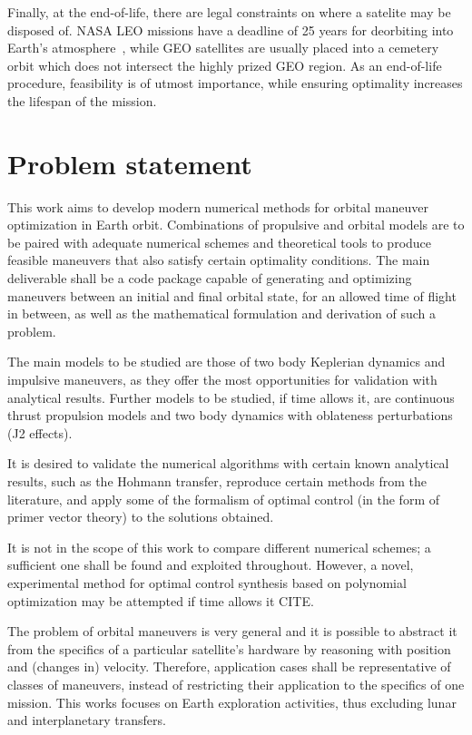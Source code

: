 Finally, at the end-of-life, there are legal constraints on where a satelite may be disposed of. NASA LEO missions have a deadline of 25 years for deorbiting into Earth's atmosphere~\cite{nasa_deorbit}, while GEO satellites are usually placed into a cemetery orbit which does not intersect the highly prized GEO region. As an end-of-life procedure, feasibility is of utmost importance, while ensuring optimality increases the lifespan of the mission.

\section{Problem statement}

This work aims to develop modern numerical methods for orbital maneuver optimization in Earth orbit. Combinations of propulsive and orbital models are to be paired with adequate numerical schemes and theoretical tools to produce feasible maneuvers that also satisfy certain optimality conditions. The main deliverable shall be a code package capable of generating and optimizing maneuvers between an initial and final orbital state, for an allowed time of flight in between, as well as the mathematical formulation and derivation of such a problem.

The main models to be studied are those of two body Keplerian dynamics and impulsive maneuvers, as they offer the most opportunities for validation with analytical results. Further models to be studied, if time allows it, are continuous thrust propulsion models and two body dynamics with oblateness perturbations (J2 effects).

It is desired to validate the numerical algorithms with certain known analytical results, such as the Hohmann transfer, reproduce certain methods from the literature, and apply some of the formalism of optimal control (in the form of primer vector theory) to the solutions obtained. 

It is not in the scope of this work to compare different numerical schemes; a sufficient one shall be found and exploited throughout. However, a novel, experimental method for optimal control synthesis based on polynomial optimization may be attempted if time allows it CITE\@.

The problem of orbital maneuvers is very general and it is possible to abstract it from the specifics of a particular satellite's hardware by reasoning with position and (changes in) velocity. Therefore, application cases shall be representative of classes of maneuvers, instead of restricting their application to the specifics of one mission. This works focuses on Earth exploration activities, thus excluding lunar and interplanetary transfers.


